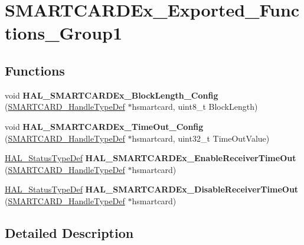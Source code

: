 \hypertarget{group___s_m_a_r_t_c_a_r_d_ex___exported___functions___group1}{}\section{S\+M\+A\+R\+T\+C\+A\+R\+D\+Ex\+\_\+\+Exported\+\_\+\+Functions\+\_\+\+Group1}
\label{group___s_m_a_r_t_c_a_r_d_ex___exported___functions___group1}
\subsection*{Functions}
\begin{DoxyCompactItemize}
\item 
\mbox{\label{group___s_m_a_r_t_c_a_r_d_ex___exported___functions___group1_ga355f0284ebf636a127bf3e9cdb15f457}} 
void {\bfseries H\+A\+L\+\_\+\+S\+M\+A\+R\+T\+C\+A\+R\+D\+Ex\+\_\+\+Block\+Length\+\_\+\+Config} (\hyperlink{struct_s_m_a_r_t_c_a_r_d___handle_type_def}{S\+M\+A\+R\+T\+C\+A\+R\+D\+\_\+\+Handle\+Type\+Def} $\ast$hsmartcard, uint8\+\_\+t Block\+Length)
\item 
\mbox{\label{group___s_m_a_r_t_c_a_r_d_ex___exported___functions___group1_ga4f1d0e5cc74507c191ed138eb285862a}} 
void {\bfseries H\+A\+L\+\_\+\+S\+M\+A\+R\+T\+C\+A\+R\+D\+Ex\+\_\+\+Time\+Out\+\_\+\+Config} (\hyperlink{struct_s_m_a_r_t_c_a_r_d___handle_type_def}{S\+M\+A\+R\+T\+C\+A\+R\+D\+\_\+\+Handle\+Type\+Def} $\ast$hsmartcard, uint32\+\_\+t Time\+Out\+Value)
\item 
\mbox{\label{group___s_m_a_r_t_c_a_r_d_ex___exported___functions___group1_ga361220722c8f7bc73abfd03b075013d7}} 
\hyperlink{stm32f0xx__hal__def_8h_a63c0679d1cb8b8c684fbb0632743478f}{H\+A\+L\+\_\+\+Status\+Type\+Def} {\bfseries H\+A\+L\+\_\+\+S\+M\+A\+R\+T\+C\+A\+R\+D\+Ex\+\_\+\+Enable\+Receiver\+Time\+Out} (\hyperlink{struct_s_m_a_r_t_c_a_r_d___handle_type_def}{S\+M\+A\+R\+T\+C\+A\+R\+D\+\_\+\+Handle\+Type\+Def} $\ast$hsmartcard)
\item 
\mbox{\label{group___s_m_a_r_t_c_a_r_d_ex___exported___functions___group1_ga2fdd9afc44112e1b8210e6ab13165602}} 
\hyperlink{stm32f0xx__hal__def_8h_a63c0679d1cb8b8c684fbb0632743478f}{H\+A\+L\+\_\+\+Status\+Type\+Def} {\bfseries H\+A\+L\+\_\+\+S\+M\+A\+R\+T\+C\+A\+R\+D\+Ex\+\_\+\+Disable\+Receiver\+Time\+Out} (\hyperlink{struct_s_m_a_r_t_c_a_r_d___handle_type_def}{S\+M\+A\+R\+T\+C\+A\+R\+D\+\_\+\+Handle\+Type\+Def} $\ast$hsmartcard)
\end{DoxyCompactItemize}


\subsection{Detailed Description}
